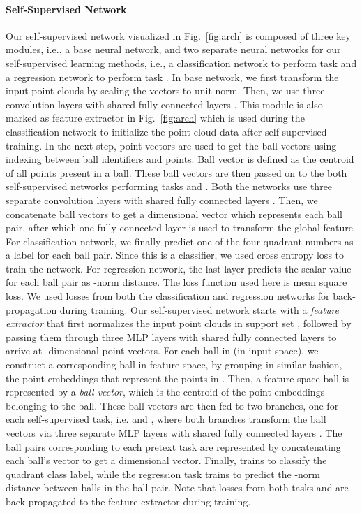 \documentclass{article}
\begin{document}
\paragraph{Self-Supervised Network}
Our self-supervised network visualized in Fig.~\ref{fig:arch} is composed of three key modules, i.e., a base neural network, and two separate neural networks for our self-supervised learning methods, i.e., a classification network to perform task  and a regression network to perform task . In base network, we first transform the input point clouds by scaling the vectors to unit norm. Then, we use three convolution layers with shared fully connected layers . This module is also marked as feature extractor in Fig.~\ref{fig:arch} which is used during the classification network to initialize the point cloud data after self-supervised training. In the next step, point vectors are used to get the ball vectors using indexing between ball identifiers and points. Ball vector is defined as the centroid of all points present in a ball. These ball vectors are then passed on to the both self-supervised networks performing tasks  and . Both the networks use three separate convolution layers with shared fully connected layers . Then, we concatenate ball vectors to get a  dimensional vector which represents each ball pair, after which one fully connected layer is used to transform the global feature. For classification network, we finally predict one of the four quadrant numbers as a label for each ball pair. Since this is a classifier, we used cross entropy loss to train the network. For regression network, the last layer predicts the scalar value for each ball pair as -norm distance. The loss function used here is mean square loss. We used losses from both the classification and regression networks for back-propagation during training. \fi
Our self-supervised network starts with a \emph{feature extractor} that first normalizes the input point clouds in support set , followed by passing them through three MLP layers with shared fully connected layers  to arrive at -dimensional point vectors. For each ball  in  (in input space), we construct a corresponding ball in feature space, by grouping in similar fashion, the point embeddings that represent the points in . Then, a feature space ball is represented by a \emph{ball vector}, which is the centroid of the point embeddings belonging to the ball. These ball vectors are then fed to two branches, one for each self-supervised task, i.e.  and , where both branches transform the ball vectors via three separate MLP layers with shared fully connected layers . The ball pairs corresponding to each pretext task are represented by concatenating each ball's vector to get a  dimensional vector. Finally,  trains to classify the quadrant class label, while the regression task  trains to predict the -norm distance between balls in the ball pair. Note that losses from both tasks  and  are back-propagated to the feature extractor during training.
\end{document}
